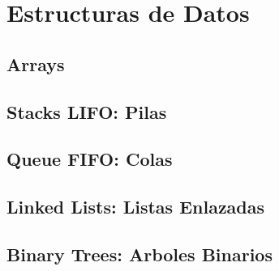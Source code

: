 \documentclass[12pt, fleqn]{report}                             %
\theoremstyle{break}                                            %
\begin{document}
\part{Estructuras de Datos}

    \clearpage
    \chapter{Arrays}

    \clearpage
    \chapter{Stacks LIFO: Pilas}

    \clearpage
    \chapter{Queue FIFO: Colas}

    \clearpage
    \chapter{Linked Lists: Listas Enlazadas}


    \clearpage
    \chapter{Binary Trees: Arboles Binarios}
\end{document}
